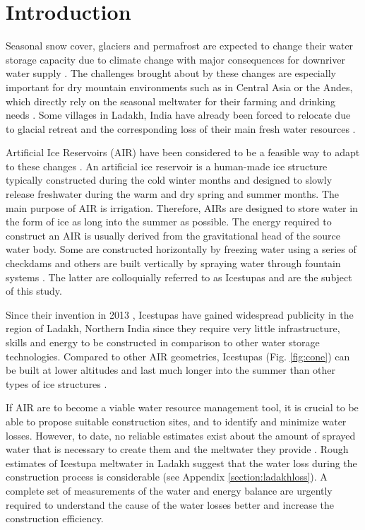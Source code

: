 \documentclass[utf8]{frontiersSCNS} %
\begin{document}
\section{Introduction}

Seasonal snow cover, glaciers and permafrost are expected to change their water storage capacity due to climate change
with major consequences for downriver water supply \citep{Immerzeel_2020}. The challenges brought about by these
changes are especially important for dry mountain environments such as in Central Asia or the Andes, which directly
rely on the seasonal meltwater for their farming and drinking needs \citep{HoelzleBarandun_2019, Apel_2018,
Buytaert_2017, Chen_2016, UNGERSHAYESTEH_2013}. Some villages in Ladakh, India have already been forced to relocate due
to glacial retreat and the corresponding loss of their main fresh water resources \citep{zanskar}. 

Artificial Ice Reservoirs (AIR) have been considered to be a feasible way to adapt to these changes \citep{IPCC_2019,
10.1659/MRD-JOURNAL-D-18-00072.1}. An artificial ice reservoir is a human-made ice structure typically constructed
during the cold winter months and designed to slowly release freshwater during the warm and dry spring and summer
months. The main purpose of AIR is irrigation. Therefore, AIRs are designed to store water in the form of ice as long
into the summer as possible. The energy required to construct an AIR is usually derived from the gravitational head of
the source water body. Some are constructed horizontally by freezing water using a series of checkdams and others are
built vertically by spraying water through fountain systems \citep{Nusser_2018}. The latter are colloquially referred
to as Icestupas and are the subject of this study.

Since their invention in 2013 \citep{campaign}, Icestupas have gained widespread publicity in the region of Ladakh,
Northern India since they require very little infrastructure, skills and energy to be constructed in comparison to
other water storage technologies. Compared to other AIR geometries, Icestupas (Fig.  \ref{fig:cone}) can be built at
lower altitudes and last much longer into the summer than other types of ice structures \citep{campaign}.

If AIR are to become a viable water resource management tool, it is crucial to be able to propose suitable construction
sites, and to identify and minimize water losses. However, to date, no reliable estimates exist about the amount of
sprayed water that is necessary to create them and the meltwater they provide \citep{Nusser_2018}. Rough
estimates of Icestupa meltwater in Ladakh suggest that the water loss during the construction process is considerable
(see Appendix \ref{section:ladakhloss}). A complete set of measurements of the water and energy balance are urgently
required to understand the cause of the water losses better and increase the construction efficiency.
\end{document}
